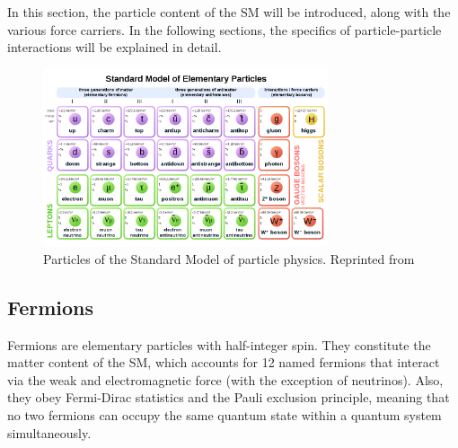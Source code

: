 In this section, the particle content of the SM will be introduced, along with the various force carriers. In the following sections, the specifics of particle-particle interactions will be explained in detail.

    \begin{figure}[h]
 	\centering
 	\includegraphics[width=0.75\textwidth]{figures/SMall.png}
 	\singlespace
 	\caption{Particles of the Standard Model of particle physics. Reprinted from \cite{StandardModelDiagram}}
 	\label{fig:stdmcer}
	\end{figure}

\subsection{Fermions}
Fermions are elementary particles with half-integer spin. They constitute the matter content of the SM, which accounts for 12 named fermions that interact via the weak and electromagnetic force (with the exception of neutrinos). Also, they obey Fermi-Dirac statistics and the Pauli exclusion principle, meaning that no two fermions can occupy the same quantum state within a quantum system simultaneously.



